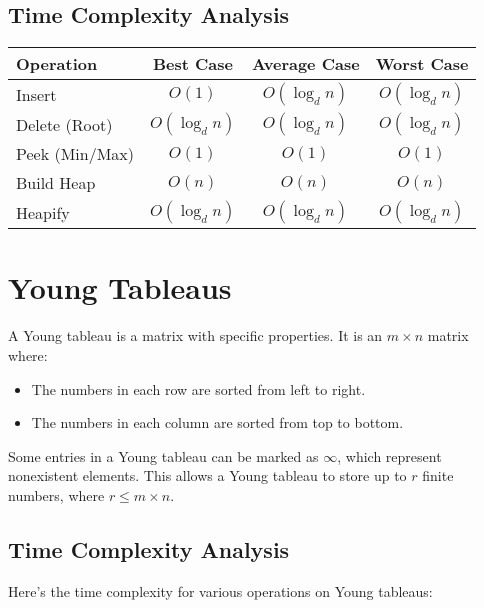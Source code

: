 \documentclass[a4paper,10pt]{article}
\begin{document}
\subsection*{Time Complexity Analysis}
\begin{table}[H]
    \raggedright
    \begin{tabular}{|l|c|c|c|}
    \hline
    \textbf{Operation} & \textbf{Best Case} & \textbf{Average Case} & \textbf{Worst Case} \\ \hline
    Insert             & $O(1)$             & $O(\log_d n)$         & $O(\log_d n)$       \\ \hline
    Delete (Root)      & $O(\log_d n)$      & $O(\log_d n)$         & $O(\log_d n)$       \\ \hline
    Peek (Min/Max)     & $O(1)$             & $O(1)$                & $O(1)$              \\ \hline
    Build Heap         & $O(n)$             & $O(n)$                & $O(n)$              \\ \hline
    Heapify            & $O(\log_d n)$      & $O(\log_d n)$         & $O(\log_d n)$       \\ \hline
    \end{tabular}
\end{table}


\section{Young Tableaus}
A Young tableau is a matrix with specific properties. It is an $m \times n$ matrix where:

\begin{itemize}
    \item The numbers in each row are sorted from left to right.
    \item The numbers in each column are sorted from top to bottom.
\end{itemize}

Some entries in a Young tableau can be marked as $\infty$, which represent nonexistent elements. This allows a Young tableau to store up to $r$ finite numbers, where $r \leq m \times n$.

\subsection*{Time Complexity Analysis}
Here’s the time complexity for various operations on Young tableaus:
\end{document}
